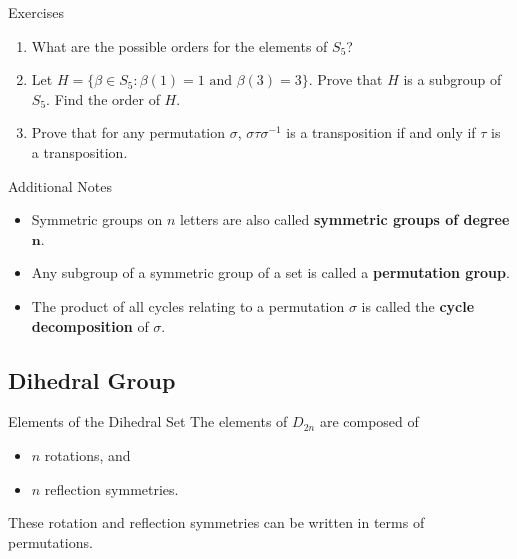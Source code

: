 \documentclass{beamer}
\begin{document}
\begin{frame}{Exercises}
\begin{enumerate}
\justifying
\item What are the possible orders for the elements of $S_5$?
\item Let $H = \{\beta \in S_5: \beta(1) = 1 \text{ and } \beta(3) = 3\}$. Prove that $H$ is a subgroup of $S_5$. Find the order of $H$.
\item Prove that for any permutation $\sigma$, $\sigma\tau\sigma^{-1}$ is a transposition if and only if $\tau$ is a transposition.
\end{enumerate}
\end{frame}

\begin{frame}{Additional Notes}
\begin{itemize}
\item Symmetric groups on $n$ letters are also called \textbf{symmetric groups of degree $\boldsymbol{n}$}.
\item Any subgroup of a symmetric group of a set is called a \textbf{permutation group}.
\item The product of all cycles relating to a permutation $\sigma$ is called the \textbf{cycle decomposition} of $\sigma$.
\end{itemize}    
\end{frame}

\subsection{Dihedral Group}

\begin{frame}{Elements of the Dihedral Set}
The elements of $D_{2n}$ are composed of
\begin{itemize}
    \item $n$ rotations, and
    \item $n$ reflection symmetries.
\end{itemize}
These rotation and reflection symmetries can be written in terms of permutations.
\end{frame}
\end{document}
